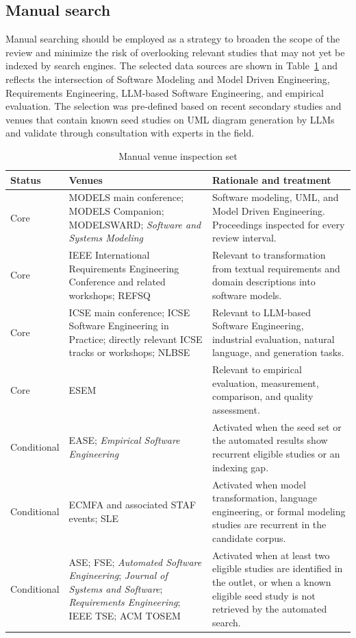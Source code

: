\subsection{Manual search}

Manual searching should be employed as a strategy to broaden the scope of the review and minimize the risk of overlooking relevant studies that may not yet be indexed by search engines. The selected data sources are shown in Table~\ref{tab:protocol_manual_venues} and reflects the intersection of Software Modeling and Model Driven Engineering, Requirements Engineering, LLM-based Software Engineering, and empirical evaluation. The selection was pre-defined based on recent secondary studies and venues that contain known seed studies on UML diagram generation by LLMs and validate through consultation with experts in the field\cite{Zhang2027LLMMDE,Rahmanian2026Diagrams,DeBari2024UML,Ferrari2024Sequence,Garaccione2025Class,Garaccione2025UseCase,Xiao2025Sequence}.

\begin{table}[htbp]
\centering
\scriptsize
\caption{Manual venue inspection set}
\label{tab:protocol_manual_venues}
\begin{tabularx}{\textwidth}{p{} p{} X}
\toprule
\textbf{Status} & \textbf{Venues} & \textbf{Rationale and treatment} \\
\midrule
Core & MODELS main conference; MODELS Companion; MODELSWARD; \emph{Software and Systems Modeling} & Software modeling, UML, and Model Driven Engineering. Proceedings inspected for every review interval. \\
Core & IEEE International Requirements Engineering Conference and related workshops; REFSQ & Relevant to transformation from textual requirements and domain descriptions into software models. \\
Core & ICSE main conference; ICSE Software Engineering in Practice; directly relevant ICSE tracks or workshops; NLBSE & Relevant to LLM-based Software Engineering, industrial evaluation, natural language, and generation tasks. \\
Core & ESEM & Relevant to empirical evaluation, measurement, comparison, and quality assessment. \\
Conditional & EASE; \emph{Empirical Software Engineering} & Activated when the seed set or the automated results show recurrent eligible studies or an indexing gap. \\
Conditional & ECMFA and associated STAF events; SLE & Activated when model transformation, language engineering, or formal modeling studies are recurrent in the candidate corpus. \\
Conditional & ASE; FSE; \emph{Automated Software Engineering}; \emph{Journal of Systems and Software}; \emph{Requirements Engineering}; IEEE TSE; ACM TOSEM & Activated when at least two eligible studies are identified in the outlet, or when a known eligible seed study is not retrieved by the automated search. \\
\bottomrule
\end{tabularx}
\end{table}

